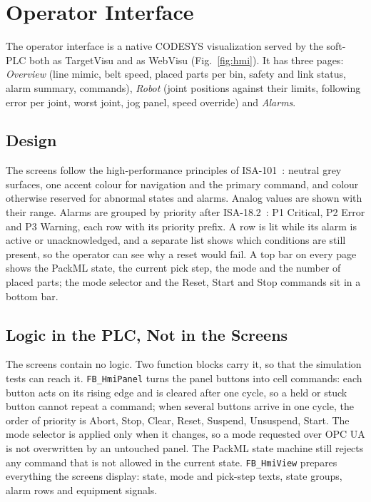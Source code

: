 \section{Operator Interface}\label{sec:hmi}

The operator interface is a native CODESYS visualization served by the soft-PLC both as
TargetVisu and as WebVisu (Fig.~\ref{fig:hmi}). It has three pages: \emph{Overview} (line mimic,
belt speed, placed parts per bin, safety and link status, alarm summary, commands),
\emph{Robot} (joint positions against their limits, following error per joint, worst joint, jog
panel, speed override) and \emph{Alarms}.

\subsection{Design}

The screens follow the high-performance principles of ISA-101~\cite{ISA-101.01}: neutral grey
surfaces, one accent colour for navigation and the primary command, and colour otherwise reserved
for abnormal states and alarms. Analog values are shown with their range. Alarms are grouped by
priority after ISA-18.2~\cite{ISA-18.2}: P1 Critical, P2 Error and P3 Warning, each row with its
priority prefix. A row is lit while its alarm is active or unacknowledged, and a separate list
shows which conditions are still present, so the operator can see why a reset would fail. A top
bar on every page shows the PackML state, the current pick step, the mode and the number of
placed parts; the mode selector and the Reset, Start and Stop commands sit in a bottom bar.

\subsection{Logic in the PLC, Not in the Screens}

The screens contain no logic. Two function blocks carry it, so that the simulation tests can
reach it. \texttt{FB\_HmiPanel} turns the panel buttons into cell commands: each button acts on
its rising edge and is cleared after one cycle, so a held or stuck button cannot repeat a
command; when several buttons arrive in one cycle, the order of priority is Abort, Stop, Clear,
Reset, Suspend, Unsuspend, Start. The mode selector is applied only when it changes, so a mode
requested over OPC UA is not overwritten by an untouched panel. The PackML state machine still
rejects any command that is not allowed in the current state. \texttt{FB\_HmiView} prepares
everything the screens display: state, mode and pick-step texts, state groups, alarm rows and
equipment signals.


